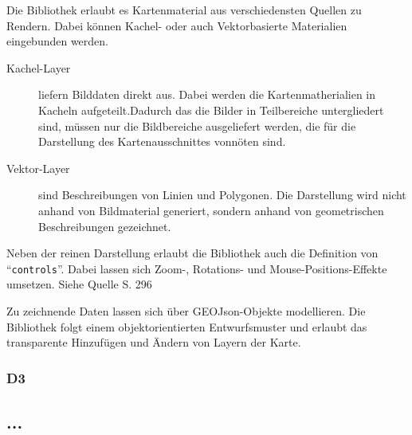     Die Bibliothek erlaubt es Kartenmaterial aus verschiedensten Quellen zu Rendern. Dabei können Kachel- oder auch Vektorbasierte Materialien eingebunden werden.
    
    \begin{description}
     \item [Kachel-Layer]  liefern Bilddaten direkt aus. Dabei werden die Kartenmatherialien in Kacheln aufgeteilt.Dadurch das die Bilder in Teilbereiche untergliedert sind, müssen nur die Bildbereiche ausgeliefert werden, die für die Darstellung des Kartenausschnittes vonnöten sind.
     
     \item [Vektor-Layer] sind Beschreibungen von Linien und Polygonen. Die Darstellung wird nicht anhand von Bildmaterial generiert, sondern anhand von geometrischen Beschreibungen gezeichnet. 
    \end{description}
    
    Neben der reinen Darstellung erlaubt die Bibliothek auch die Definition von  "`\texttt{controls}"'. Dabei lassen sich Zoom-, Rotations- und Mouse-Positions-Effekte umsetzen. Siehe Quelle \cite{openlayersbeginnersguide} S. 296
    
    Zu zeichnende Daten lassen sich über GEOJson-Objekte modellieren. Die Bibliothek folgt einem objektorientierten Entwurfsmuster und erlaubt das transparente Hinzufügen und Ändern von Layern der Karte.
    
    

    \subsubsection{D3}
    
    \subsection{...}

